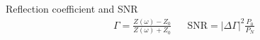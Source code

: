 \documentclass[../main.tex]{subfiles}
\begin{document}
\begin{frame}{Reflection coefficient and SNR}
\begin{align*}
    \Gamma = \frac{Z(\omega) - Z_{0}}{Z(\omega) + Z_{0}} && 
    \text{SNR} = |\Delta\Gamma|^2\frac{P_{0}}{P_{N}}
\end{align*}
\end{frame}

\end{document}
